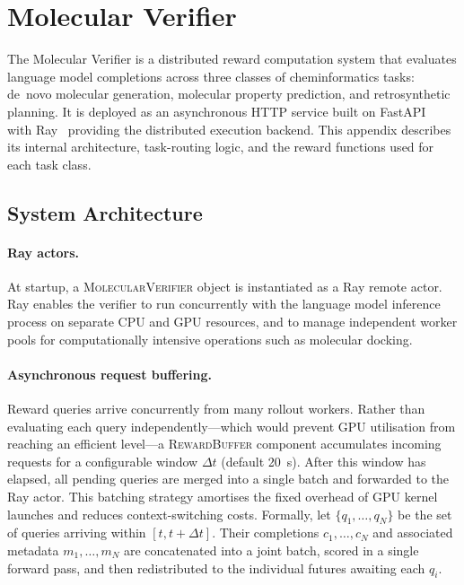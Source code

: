 \section{Molecular Verifier}
\label{app:verifier}

The Molecular Verifier is a distributed reward computation system that
evaluates language model completions across three classes of cheminformatics
tasks: de~novo molecular generation, molecular property prediction, and
retrosynthetic planning.  It is deployed as an asynchronous HTTP service built
on FastAPI~\citep{fastapi} with Ray~\citep{ray} providing the distributed
execution backend.  This appendix describes its internal architecture,
task-routing logic, and the reward functions used for each task class.

\subsection{System Architecture}
\label{app:verifier:architecture}

\paragraph{Ray actors.}
At startup, a \textsc{MolecularVerifier} object is instantiated as a Ray
remote actor.  Ray enables the verifier to run concurrently with the language
model inference process on separate CPU and GPU resources, and to manage
independent worker pools for computationally intensive operations such as
molecular docking.

\paragraph{Asynchronous request buffering.}
Reward queries arrive concurrently from many rollout workers.  Rather than
evaluating each query independently—which would prevent GPU utilisation from
reaching an efficient level—a \textsc{RewardBuffer} component accumulates
incoming requests for a configurable window $\Delta t$ (default
\SI{20}{\second}).  After this window has elapsed, all pending queries are
merged into a single batch and forwarded to the Ray actor.  This batching
strategy amortises the fixed overhead of GPU kernel launches and reduces
context-switching costs.  Formally, let $\{q_1, \ldots, q_N\}$ be the set of
queries arriving within $[t, t+\Delta t]$.  Their completions
$c_1,\ldots,c_N$ and associated metadata
$m_1,\ldots,m_N$ are concatenated into a joint batch, scored in a single
forward pass, and then redistributed to the individual futures awaiting each
$q_i$.

